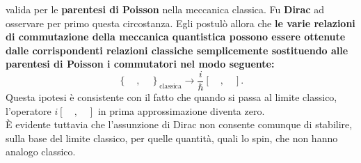 \documentclass[a4paper,12pt,oneside]{book}
\begin{document}
valida per le \textbf{parentesi di Poisson} nella meccanica classica. Fu \textbf{Dirac} ad osservare per primo questa circostanza. Egli postulò allora che \textbf{le varie relazioni di commutazione della meccanica quantistica possono essere ottenute dalle corrispondenti relazioni classiche semplicemente sostituendo alle parentesi di Poisson i commutatori nel modo seguente:}
\begin{equation}
\left\{ \quad, \quad \right\} _{\textrm{classica}} \rightarrow \frac{i}{\hbar}\left[ \quad, \quad \right] .
\end{equation}
Questa ipotesi è consistente con il fatto che quando si passa al limite classico, l'operatore $i\left[ \quad, \quad \right]$ in prima approssimazione diventa zero.\\
È evidente tuttavia che l'assunzione di Dirac non consente comunque di stabilire, sulla base del limite classico, per quelle quantità, quali lo spin, che non hanno analogo classico.
\end{document}
